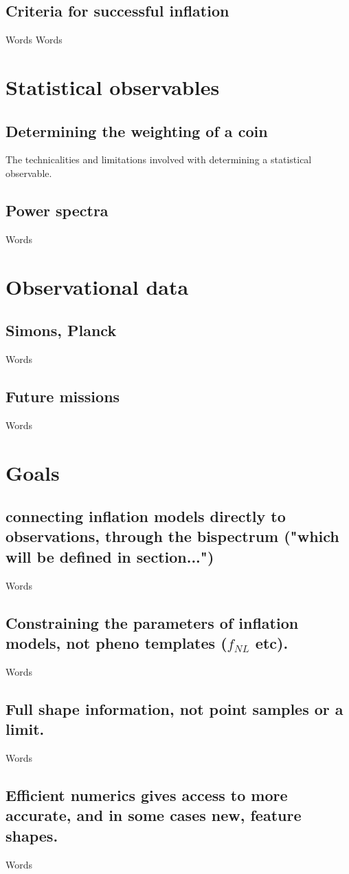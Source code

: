     \subsection{Criteria for successful inflation}
    Words
\newpage
    Words
\newpage
\section{Statistical observables}
    \subsection{Determining the weighting of a coin}
    The technicalities and limitations involved with determining a statistical observable.
\newpage
    \subsection{Power spectra}
    Words
\newpage
\section{Observational data}
    \subsection{Simons, Planck}
    Words
\newpage
    \subsection{Future missions}
    Words
\newpage
\section{Goals}
    \subsection{connecting inflation models directly to observations, through the bispectrum ("which will be defined in section...")}
    Words
    \subsection{Constraining the parameters of inflation models, not pheno templates ($f_{NL}$ etc).}
    Words
    \subsection{Full shape information, not point samples or a limit.}
    Words
    \subsection{Efficient numerics gives access to more accurate, and in some cases new, feature shapes.}
    Words
\newpage
